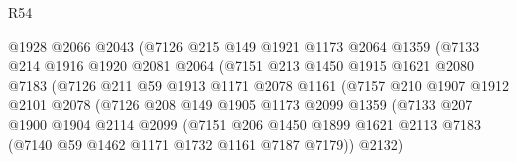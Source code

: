 \begin{lexlean}{R54}
\begin{coremodule}
                              @1928
                              @2066
                              @2043
                              (@7126
                                @215
                                @149
                                @1921
                                @1173
                                @2064
                                @1359
                                (@7133
                                  @214
                                  @1916
                                  @1920
                                  @2081
                                  @2064
                                  (@7151
                                    @213
                                    @1450
                                    @1915
                                    @1621
                                    @2080
                                    @7183
                                    (@7126
                                      @211
                                      @59
                                      @1913
                                      @1171
                                      @2078
                                      @1161
                                      (@7157
                                        @210
                                        @1907
                                        @1912
                                        @2101
                                        @2078
                                        (@7126
                                          @208
                                          @149
                                          @1905
                                          @1173
                                          @2099
                                          @1359
                                          (@7133
                                            @207
                                            @1900
                                            @1904
                                            @2114
                                            @2099
                                            (@7151
                                              @206
                                              @1450
                                              @1899
                                              @1621
                                              @2113
                                              @7183
                                              (@7140 @59 @1462 @1171 @1732 @1161 @7187 @7179))
                                            @2132)

\end{coremodule}
\end{lexlean}
